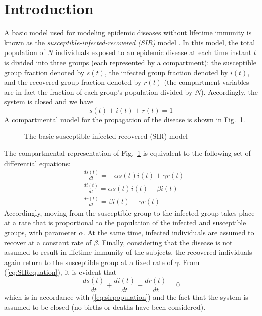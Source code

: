 \documentclass[journal,a4paper,twocolumn]{IEEEtran}
\theoremstyle{definition}
\begin{document}
\section{Introduction
\label{sec:introduction}}
A basic model used for modeling epidemic diseases without lifetime immunity is known as the \textit{susceptible-infected-recovered (SIR)} model \cite{anderson1979population,may1979population,brauer2012mathematical}. In this model, the total population of $N$ individuals exposed to an epidemic disease at each time instant $t$ is divided into three groups (each represented by a compartment): the susceptible group fraction denoted by $s(t)$, the infected group fraction denoted by $i(t)$, and the recovered group fraction denoted by $r(t)$ (the compartment variables are in fact the fraction of each group's population divided by $N$). Accordingly, the system is closed and we have
\begin{equation}
 s(t)+i(t)+r(t) = 1
 \label{eq:sirpopulation}
\end{equation}
A compartmental model for the propagation of the disease is shown in Fig.~\ref{fig:sir}. 
\begin{figure}[b]
\MediumPicture{}
\caption{The basic susceptible-infected-recovered (SIR) model}
\label{fig:sir}
\end{figure}
The compartmental representation of Fig.~\ref{fig:sir} is equivalent to the following set of differential equations:
\begin{equation}
\begin{aligned}
 &\frac{ds(t)}{dt}=-\alpha s(t)i(t) +\gamma r(t)\\
 &\frac{di(t)}{dt}= \alpha s(t) i(t) - \beta i(t)\\
 &\frac{dr(t)}{dt}= \beta i(t) -\gamma r(t)
 \end{aligned}
\label{eq:SIRequation}
\end{equation}
Accordingly, moving from the susceptible group to the infected group takes place at a rate that is proportional to the population of the infected and susceptible groups, with parameter $\alpha$. At the same time, infected individuals are assumed to recover at a constant rate of $\beta$. Finally, considering that the disease is not assumed to result in lifetime immunity of the subjects, the recovered individuals again return to the susceptible group at a fixed rate of $\gamma$. From (\ref{eq:SIRequation}), it is evident that 
\begin{equation}
\frac{ds(t)}{dt}+\frac{di(t)}{dt}+\frac{dr(t)}{dt}=0
\end{equation}
which is in accordance with (\ref{eq:sirpopulation}) and the fact that the system is assumed to be closed (no births or deaths have been considered).
\end{document}
